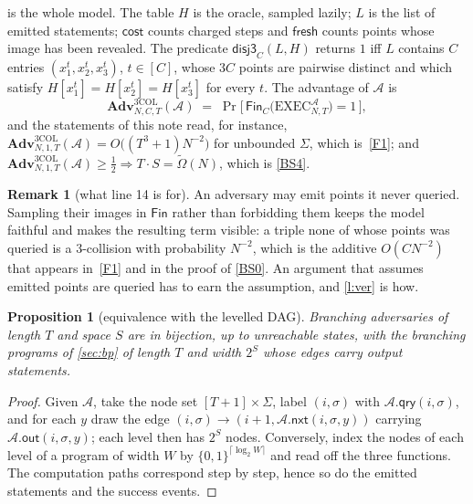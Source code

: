 \documentclass[11pt]{article}
\theoremstyle{plain}
\newtheorem{proposition}{Proposition}
\theoremstyle{definition}
\newtheorem{remark}{Remark}
\newcommand{\advers}{\mathcal{A}}
\newcommand{\qry}{\mathsf{qry}}
\newcommand{\nxt}{\mathsf{nxt}}
\newcommand{\outp}{\mathsf{out}}
\newcommand{\Exec}{\mathrm{EXEC}}
\newcommand{\Col}{\mathrm{3COL}}
\newcommand{\Fin}{\mathsf{Fin}}
\newcommand{\Adv}{\mathbf{Adv}}
\begin{document}
 is the whole model.  The table $H$ is the oracle, sampled
lazily; $L$ is the list of emitted statements; $\mathsf{cost}$ counts
charged steps and $\mathsf{fresh}$ counts points whose image has been
revealed.  The predicate $\mathsf{disj3}_{C}(L,H)$ returns $1$ iff $L$
contains $C$ entries $(x^{t}_{1},x^{t}_{2},x^{t}_{3})$, $t \in [C]$, whose
$3C$ points are pairwise distinct and which satisfy
$H[x^{t}_{1}] = H[x^{t}_{2}] = H[x^{t}_{3}]$ for every $t$.  The advantage
of $\advers$ is
\[
  \Adv^{\Col}_{N,C,T}(\advers) \;=\;
  \Pr\bigl[\,\Fin_{C}\bigl(\Exec^{\advers}_{N,T}\bigr) = 1\,\bigr],
\]
and the statements of this note read, for instance,
$\Adv^{\Col}_{N,1,T}(\advers) = O\bigl((T^{3}+1)N^{-2}\bigr)$ for
unbounded $\Sigma$, which is~\ref{F1}; and
$\Adv^{\Col}_{N,1,T}(\advers) \geq \tfrac12 \Rightarrow T\cdot S =
\tilde\Omega(N)$, which is \cref{BS4}.

\begin{remark}[what line 14 is for]\label{r:guess}
An adversary may emit points it never queried.  Sampling their images in
$\Fin$ rather than forbidding them keeps the model faithful and makes the
resulting term visible: a triple none of whose points was queried is a
$3$-collision with probability $N^{-2}$, which is the additive
$O(CN^{-2})$ that appears in~\ref{F1} and in the proof of \cref{BS0}.  An
argument that assumes emitted points are queried has to earn the
assumption, and \cref{l:ver} is how.
\end{remark}

\begin{proposition}[equivalence with the levelled DAG]\label{p:dag}
Branching adversaries of length $T$ and space $S$ are in bijection, up to
unreachable states, with the branching programs of \cref{sec:bp} of length
$T$ and width $2^{S}$ whose edges carry output statements.
\end{proposition}

\begin{proof}
Given $\advers$, take the node set $[T+1] \times \Sigma$, label $(i,\sigma)$
with $\advers.\qry(i,\sigma)$, and for each $y$ draw the edge
$(i,\sigma) \to (i+1,\advers.\nxt(i,\sigma,y))$ carrying
$\advers.\outp(i,\sigma,y)$; each level then has $2^{S}$ nodes.  Conversely,
index the nodes of each level of a program of width $W$ by
$\{0,1\}^{\lceil\log_{2}W\rceil}$ and read off the three functions.  The
computation paths correspond step by step, hence so do the emitted
statements and the success events.
\end{proof}
\end{document}

